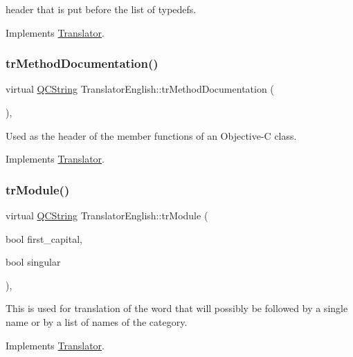 header that is put before the list of typedefs. 

Implements \mbox{\hyperlink{class_translator}{Translator}}.

\mbox{\label{class_translator_english_a795a1da3c238b58c6d13371e2a044612}} 
\subsubsection{\texorpdfstring{trMethodDocumentation()}{trMethodDocumentation()}}
{\footnotesize\ttfamily virtual \mbox{\hyperlink{class_q_c_string}{Q\+C\+String}} Translator\+English\+::tr\+Method\+Documentation (\begin{DoxyParamCaption}{ }\end{DoxyParamCaption})\hspace{0.3cm}{\ttfamily [inline]}, {\ttfamily [virtual]}}

Used as the header of the member functions of an Objective-\/C class. 

Implements \mbox{\hyperlink{class_translator}{Translator}}.

\mbox{\label{class_translator_english_a43eb0e5c261168c45ac3bb29a92a6c26}} 
\subsubsection{\texorpdfstring{trModule()}{trModule()}}
{\footnotesize\ttfamily virtual \mbox{\hyperlink{class_q_c_string}{Q\+C\+String}} Translator\+English\+::tr\+Module (\begin{DoxyParamCaption}\item[{bool}]{first\+\_\+capital,  }\item[{bool}]{singular }\end{DoxyParamCaption})\hspace{0.3cm}{\ttfamily [inline]}, {\ttfamily [virtual]}}

This is used for translation of the word that will possibly be followed by a single name or by a list of names of the category. 

Implements \mbox{\hyperlink{class_translator}{Translator}}.

